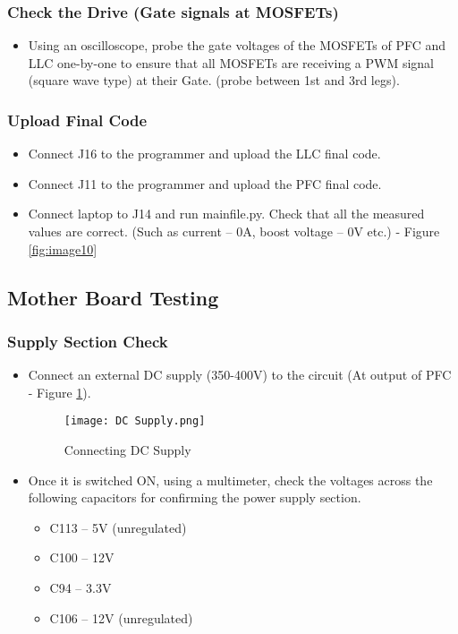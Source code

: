 \subsubsection{Check the Drive (Gate signals at MOSFETs)}
\begin{itemize}
    \item Using an oscilloscope, probe the gate voltages of the MOSFETs of PFC and LLC one-by-one to ensure that all MOSFETs are receiving a PWM signal (square wave type) at their Gate. (probe between 1st and 3rd legs).
\end{itemize}

\subsubsection{Upload Final Code}
\begin{itemize}
    \item Connect J16 to the programmer and upload the LLC final code. 
    \item Connect J11 to the programmer and upload the PFC final code.
    \item Connect laptop to J14 and run mainfile.py. Check that all the measured values are correct. (Such as current – 0A, boost voltage – 0V etc.) - Figure \ref{fig:image10}
\end{itemize}


\subsection{Mother Board Testing}

\subsubsection{Supply Section Check}
\begin{itemize}
    \item Connect an external DC supply (350-400V) to the circuit (At output of PFC - Figure \ref*{fig:DC_supply}).
    \begin{figure}[H]
        \centering
        \texttt{[image: DC Supply.png]}
        \caption{Connecting DC Supply}
        \label{fig:DC_supply}
    \end{figure}
    \item Once it is switched ON, using a multimeter, check the voltages across the following capacitors for confirming the power supply section.
    \begin{itemize}
        \item C113 – 5V (unregulated)
        \item C100 – 12V
        \item C94 – 3.3V
        \item C106 – 12V (unregulated)  
    \end{itemize}
\end{itemize}

